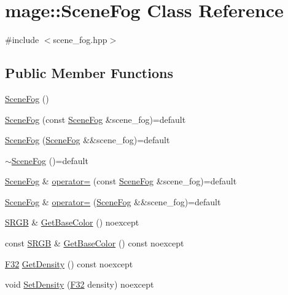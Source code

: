 \hypertarget{classmage_1_1_scene_fog}{}\section{mage\+:\+:Scene\+Fog Class Reference}
\label{classmage_1_1_scene_fog}


{\ttfamily \#include $<$scene\+\_\+fog.\+hpp$>$}

\subsection*{Public Member Functions}
\begin{DoxyCompactItemize}
\item 
\hyperlink{classmage_1_1_scene_fog_a54e3afb5450b6c5bec90448aebcd63a5}{Scene\+Fog} ()
\item 
\hyperlink{classmage_1_1_scene_fog_a203934b340b718f9b6f136100df62268}{Scene\+Fog} (const \hyperlink{classmage_1_1_scene_fog}{Scene\+Fog} \&scene\+\_\+fog)=default
\item 
\hyperlink{classmage_1_1_scene_fog_a6080ed91eb76b5872646ca8d778a2856}{Scene\+Fog} (\hyperlink{classmage_1_1_scene_fog}{Scene\+Fog} \&\&scene\+\_\+fog)=default
\item 
\hyperlink{classmage_1_1_scene_fog_afb25181d31f74e4981c226019fee0669}{$\sim$\+Scene\+Fog} ()=default
\item 
\hyperlink{classmage_1_1_scene_fog}{Scene\+Fog} \& \hyperlink{classmage_1_1_scene_fog_a2312784458fe9d8e88dcfe5c444866a4}{operator=} (const \hyperlink{classmage_1_1_scene_fog}{Scene\+Fog} \&scene\+\_\+fog)=default
\item 
\hyperlink{classmage_1_1_scene_fog}{Scene\+Fog} \& \hyperlink{classmage_1_1_scene_fog_af019127d949d50173c9d4af51a8dcaef}{operator=} (\hyperlink{classmage_1_1_scene_fog}{Scene\+Fog} \&\&scene\+\_\+fog)=default
\item 
\hyperlink{structmage_1_1_s_r_g_b}{S\+R\+GB} \& \hyperlink{classmage_1_1_scene_fog_af0b0493cac23f9bc0cf86e0f28be824c}{Get\+Base\+Color} () noexcept
\item 
const \hyperlink{structmage_1_1_s_r_g_b}{S\+R\+GB} \& \hyperlink{classmage_1_1_scene_fog_a43bb2d85e5c09a410598fe811e786d0f}{Get\+Base\+Color} () const noexcept
\item 
\hyperlink{namespacemage_aa97e833b45f06d60a0a9c4fc22ae02c0}{F32} \hyperlink{classmage_1_1_scene_fog_adb3156f178ef56223329e73abb134e1c}{Get\+Density} () const noexcept
\item 
void \hyperlink{classmage_1_1_scene_fog_a35df66af255b6d274d7048e17b15bcb6}{Set\+Density} (\hyperlink{namespacemage_aa97e833b45f06d60a0a9c4fc22ae02c0}{F32} density) noexcept
\end{DoxyCompactItemize}
